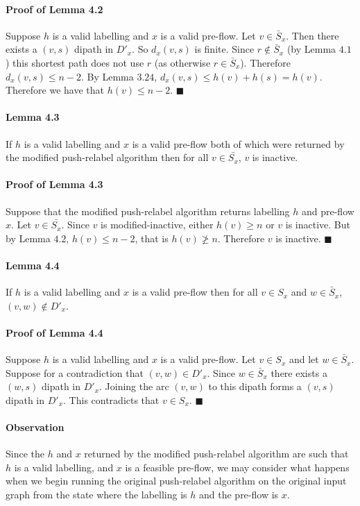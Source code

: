 \documentclass[letterpaper,12pt,oneside,onecolumn]{article}
\begin{document}
 \paragraph{Proof of Lemma 4.2}
 Suppose $h$ is a valid labelling and $x$ is a valid pre-flow. Let $v \in \bar{S}_x$. Then there exists a $(v,s)$ dipath in $D'_x$. So $d_x(v,s)$ is finite. Since $r \not\in \bar{S}_x$ (by Lemma $4.1$) this shortest path does not use $r$ (as otherwise $r \in \bar{S}_x$). Therefore $d_x(v,s) \leq n-2$. By Lemma $3.24$, $d_x(v,s) \leq h(v) + h(s) = h(v)$. Therefore we have that $h(v) \leq n-2$. $\blacksquare$
 \paragraph{Lemma 4.3}
 If $h$ is a valid labelling and $x$ is a valid pre-flow both of which were returned by the modified push-relabel algorithm then for all $v \in \bar{S_x}$, $v$ is inactive.
 \paragraph{Proof of Lemma 4.3}
 Suppose that the modified push-relabel algorithm returns labelling $h$ and pre-flow $x$. Let $v \in \bar{S_x}$. Since $v$ is modified-inactive, either $h(v) \geq n$ or $v$ is inactive. But by Lemma $4.2$, $h(v) \leq n-2$, that is $h(v) \not\geq n$. Therefore $v$ is inactive. $\blacksquare$  
 \paragraph{Lemma 4.4}
 If $h$ is a valid labelling and $x$ is a valid pre-flow then for all $v \in S_x$ and $w \in \bar{S}_x$, $(v,w) \not\in D'_x$.
 \paragraph{Proof of Lemma 4.4}
Suppose $h$ is a valid labelling and $x$ is a valid pre-flow. Let $v \in S_x$ and let $w \in \bar{S}_x$. Suppose for a contradiction that $(v,w) \in D'_x$. Since $w \in \bar{S}_x$ there exists a $(w,s)$ dipath in $D'_x$. Joining the arc $(v,w)$ to this dipath forms a $(v,s)$ dipath in $D'_x$. This contradicts that $v \in S_x$. $\blacksquare$
\paragraph{Observation}
Since the $h$ and $x$ returned by the modified push-relabel algorithm are such that $h$ is a valid labelling, and $x$ is a feasible pre-flow, we may consider what happens when we begin running the original push-relabel algorithm on the original input graph from the state where the labelling is $h$ and the pre-flow is $x$.
\end{document}
